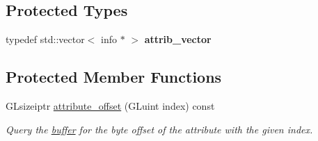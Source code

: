 \subsection*{Protected Types}
\begin{DoxyCompactItemize}
\item 
\hypertarget{classgfx_1_1buffer_a85c93d8e695b4715401764267e27b23c}{typedef std\-::vector$<$ info $\ast$ $>$ {\bfseries attrib\-\_\-vector}}\label{classgfx_1_1buffer_a85c93d8e695b4715401764267e27b23c}

\end{DoxyCompactItemize}
\subsection*{Protected Member Functions}
\begin{DoxyCompactItemize}
\item 
G\-Lsizeiptr \hyperlink{classgfx_1_1buffer_afafe95bbac44b4392e48f04cbffb16a9}{attribute\-\_\-offset} (G\-Luint index) const 
\begin{DoxyCompactList}\small\item\em Query the \hyperlink{classgfx_1_1buffer}{buffer} for the byte offset of the attribute with the given index. \end{DoxyCompactList}\end{DoxyCompactItemize}
